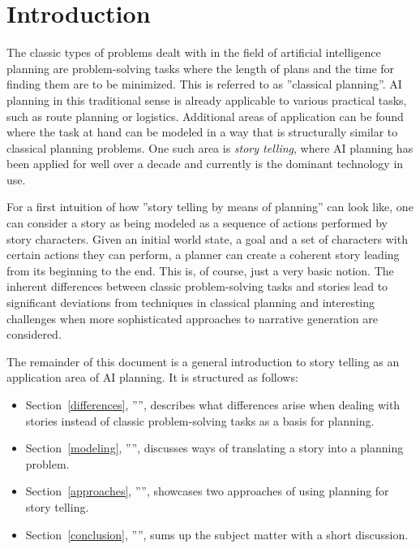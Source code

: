\section{Introduction}
The classic types of problems dealt with in the field of artificial intelligence planning are problem-solving tasks where the length of plans and the time for finding them are to be minimized. This is referred to as ''classical planning''. AI planning in this traditional sense is already applicable to various practical tasks, such as route planning or logistics. Additional areas of application can be found where the task at hand can be modeled in a way that is structurally similar to classical planning problems. One such area is \emph{story telling}, where AI planning has been applied for well over a decade and currently is the dominant technology in use\cite{Porteous10}.

For a first intuition of how ''story telling by means of planning'' can look like, one can consider a story as being modeled as a sequence of actions performed by story characters. Given an initial world state, a goal and a set of characters with certain actions they can perform, a planner can create a coherent story leading from its beginning to the end. This is, of course, just a very basic notion. The inherent differences between classic problem-solving tasks and stories lead to significant deviations from techniques in classical planning and interesting challenges when more sophisticated approaches to narrative generation are considered.

The remainder of this document is a general introduction to story telling as an application area of AI planning. It is structured as follows:
\begin{itemize}
\item Section~\ref{differences}, '''', describes what differences arise when dealing with stories instead of classic problem-solving tasks as a basis for planning.
\item Section~\ref{modeling}, '''', discusses ways of translating a story into a planning problem.
\item Section~\ref{approaches}, '''', showcases two approaches of using planning for story telling.
\item Section~\ref{conclusion}, '''', sums up the subject matter with a short discussion.
\end{itemize}
